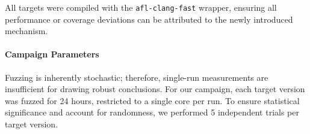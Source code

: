 All targets were compiled with the \texttt{afl-clang-fast} wrapper, ensuring all performance or coverage deviations can be attributed to the newly introduced mechanism.

\paragraph{Campaign Parameters} Fuzzing is inherently stochastic; therefore, single-run measurements are insufficient for drawing robust conclusions. For our campaign, each target version was fuzzed for 24 hours, restricted to a single core per run. To ensure statistical significance and account for randomness, we performed 5 independent trials per target version.